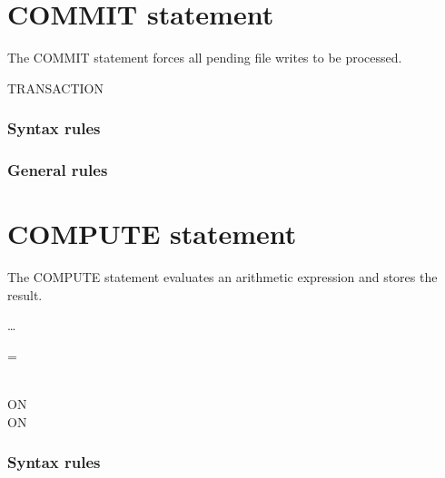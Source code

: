 \section{COMMIT statement}

The COMMIT statement forces all pending file writes to be processed.

\begin{syntax}[\miscextcolour]
   TRANSACTION
\end{syntax}

\subsubsection{Syntax rules}

\subsubsection{General rules}

\section{COMPUTE statement}

The COMPUTE statement evaluates an arithmetic expression and stores the result.

\begin{syntax}
  \begin{1=}
    \identifier
    \begin{0-1}
    \end{0-1}
  \end{1=} \ldots
  \begin{1=}
    = \\
     \\
  \end{1=}
  \arithmeticexpression

  \begin{0+}
    ON   \imperativestatement \\
     ON   \imperativestatement
  \end{0+}

  \begin{0-1}
  \end{0-1}
\end{syntax}

\subsubsection{Syntax rules}

